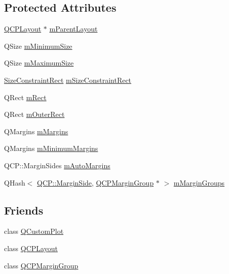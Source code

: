 \subsection*{Protected Attributes}
\begin{DoxyCompactItemize}
\item 
\mbox{\hyperlink{class_q_c_p_layout}{Q\+C\+P\+Layout}} $\ast$ \mbox{\hyperlink{class_q_c_p_layout_element_ae7c75c25549608bd688bdb65d4c38066}{m\+Parent\+Layout}}
\item 
Q\+Size \mbox{\hyperlink{class_q_c_p_layout_element_affef747c81632de33f08483b7fd10d01}{m\+Minimum\+Size}}
\item 
Q\+Size \mbox{\hyperlink{class_q_c_p_layout_element_a64a387973fd4addac842028c89088998}{m\+Maximum\+Size}}
\item 
\mbox{\hyperlink{class_q_c_p_layout_element_a0afb3e5773529e4bd20e448f81be4d2a}{Size\+Constraint\+Rect}} \mbox{\hyperlink{class_q_c_p_layout_element_acc012635b1ae178ff3c4da8a3af303a2}{m\+Size\+Constraint\+Rect}}
\item 
Q\+Rect \mbox{\hyperlink{class_q_c_p_layout_element_ad8896f05550389f7b9e92c9e6cdf6e01}{m\+Rect}}
\item 
Q\+Rect \mbox{\hyperlink{class_q_c_p_layout_element_a07bb4973379e75cb0fa5b032c1d24afd}{m\+Outer\+Rect}}
\item 
Q\+Margins \mbox{\hyperlink{class_q_c_p_layout_element_ac2a32b99ee527ca5dfff9da03628fe94}{m\+Margins}}
\item 
Q\+Margins \mbox{\hyperlink{class_q_c_p_layout_element_a5ba71f25d1af4bb092b28df618538e63}{m\+Minimum\+Margins}}
\item 
Q\+C\+P\+::\+Margin\+Sides \mbox{\hyperlink{class_q_c_p_layout_element_af61c70354d1275778d68206b2a1b2d36}{m\+Auto\+Margins}}
\item 
Q\+Hash$<$ \mbox{\hyperlink{namespace_q_c_p_a7e487e3e2ccb62ab7771065bab7cae54}{Q\+C\+P\+::\+Margin\+Side}}, \mbox{\hyperlink{class_q_c_p_margin_group}{Q\+C\+P\+Margin\+Group}} $\ast$ $>$ \mbox{\hyperlink{class_q_c_p_layout_element_aeafbbc1130e02eee663c5326761fc963}{m\+Margin\+Groups}}
\end{DoxyCompactItemize}
\subsection*{Friends}
\begin{DoxyCompactItemize}
\item 
class \mbox{\hyperlink{class_q_c_p_layout_element_a1cdf9df76adcfae45261690aa0ca2198}{Q\+Custom\+Plot}}
\item 
class \mbox{\hyperlink{class_q_c_p_layout_element_a588aac0a0d721f6c5f10126d8596a20f}{Q\+C\+P\+Layout}}
\item 
class \mbox{\hyperlink{class_q_c_p_layout_element_ad077a686e85ab6fa03dcb2fd37fc499a}{Q\+C\+P\+Margin\+Group}}
\end{DoxyCompactItemize}
